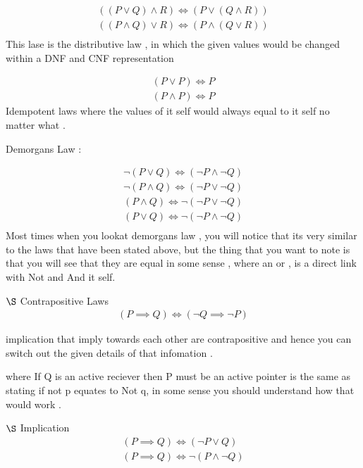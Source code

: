 \documentclass{article}
\theoremstyle{mytheoremstyle}
\theoremstyle{mytheoremstyle}
\theoremstyle{myproblemstyle}
\begin{document}
\[\begin{array}{c}
    ((P \lor Q) \land R) \iff (P \lor (Q \land R))\\
    ((P \land Q) \lor R) \iff (P \land(Q \lor R)) \\
\end{array}\]
This lase is the distributive law , in which the given values would be changed within a DNF and CNF representation

\[\begin{array}{c}
    (P \lor P) \iff P \\
    (P \land P) \iff P
\end{array}\]
Idempotent laws where the values of it self would always equal to it self no matter what .

\item Demorgans Law :

\[\begin{array}{c}
    \neg(P \lor Q) \iff (\neg P \land \neg Q)\\
    \neg(P \land Q) \iff (\neg P \lor \neg Q)\\
    (P \land Q) \iff \neg(\neg P \lor \neg Q)\\
    (P \lor Q) \iff \neg(\neg P \land \neg Q)\\
\end{array}\]
Most times when you lookat demorgans law , you will notice that its very similar to the laws that have been stated above, but the thing that you want to note is that you will see that they are equal in some sense ,  where an or , is a direct link with Not  and And it self.


\item $\S$ Contrapositive Laws
    \[\begin{array}{c}
    (P \implies Q) \iff (\neg Q \implies \neg P)
    \end{array} \]

    implication that imply towards each other are contrapositive and hence you can switch out the given details of that infomation .

    where If Q is an active reciever then P must be an active pointer is the same as stating if not p equates to Not q, in some sense you should understand how that would work .

\item $\S$  Implication
\[\begin{array}{c}
    (P \implies Q) \iff (\neg P \lor Q)\\
    (P \implies Q) \iff \neg(P \land \neg Q)
\end{array}\]
\end{document}
